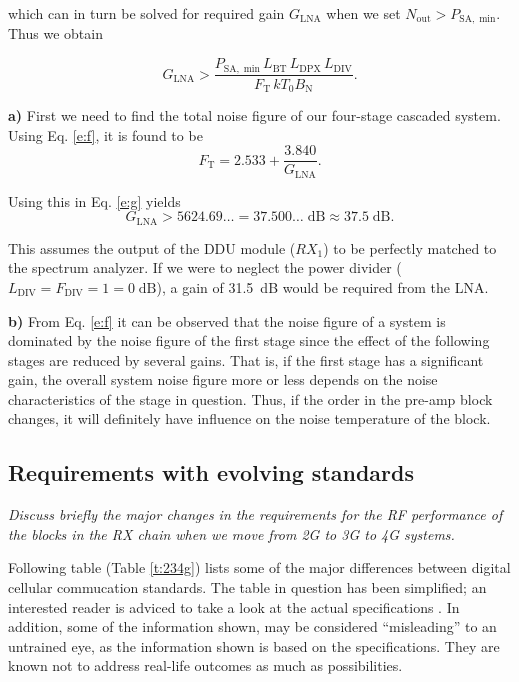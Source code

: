 \documentclass[a4paper, 12pt]{article}
\newlength{\oneLine}
\newcommand{\dB}{\mathrm{\;dB}}
\newcommand{\m}[1]{\mathrm{#1}}
\begin{document}
\noindent
which can in turn be solved for required gain $G_\mathrm{LNA}$ when we set 
$N_\mathrm{out} > P_\mathrm{SA,\;min}$. Thus we obtain

\begin{equation} \label{e:g}
G_\mathrm{LNA} > \frac{P_\mathrm{SA,\;min} \, L_\mathrm{BT} \, L_\mathrm{DPX} \, L_\mathrm{DIV}}%
	{F_\mathrm{T} \, k T_0 B_\mathrm{N}}.
\end{equation}

\vspace*{\oneLine}
\noindent
\textbf{a)} First we need to find the total noise figure of our four-stage cascaded system. 
Using Eq. \ref{e:f}, it is found to be
\begin{equation} \label{e:f2}
F_\mathrm{T} = 2.533 + \frac{3.840}{G_\m{LNA}}.
\end{equation}

\noindent
Using this in Eq. \ref{e:g} yields
\begin{equation} \label{e:g2}
G_\mathrm{LNA} > 5624.69 \ldots = 37.500 \ldots \dB \approx 37.5 \dB.
\end{equation}

This assumes the output of the DDU module ($RX_1$) to be perfectly matched 
to the spectrum analyzer. If we were to neglect the power divider 
($L_\m{DIV} = F_\m{DIV} = 1 = 0 \dB$), a gain of 31.5~dB would 
be required from the LNA.

\vspace*{\oneLine}
\noindent
\textbf{b)} From Eq. \ref{e:f} it can be observed that the noise figure of a 
system is dominated by the noise figure of the first stage since the effect of 
the following stages are reduced by several gains. That is, if the first 
stage has a significant gain, the overall system noise figure more or less 
depends on the noise characteristics of the stage in question. Thus, if the 
order in the pre-amp block changes, it will definitely have influence on the 
noise temperature of the block.


\subsection{Requirements with evolving standards}

\textit{Discuss briefly the major changes in the requirements for the 
RF performance of the blocks in the RX chain when we move from 2G to 
3G to 4G systems.}

\vspace*{\oneLine}
\noindent
Following table (Table \ref{t:234g}) lists some of the major differences 
between digital cellular commucation standards. The table in question has 
been simplified; an interested reader is adviced to take a look at the actual 
specifications \cite{2g, 3g, 4g}. In addition, some of the information shown, 
may be considered ``misleading'' to an untrained eye, as the information shown 
is based on the specifications. They are known not to address real-life outcomes 
as much as possibilities.
\end{document}
